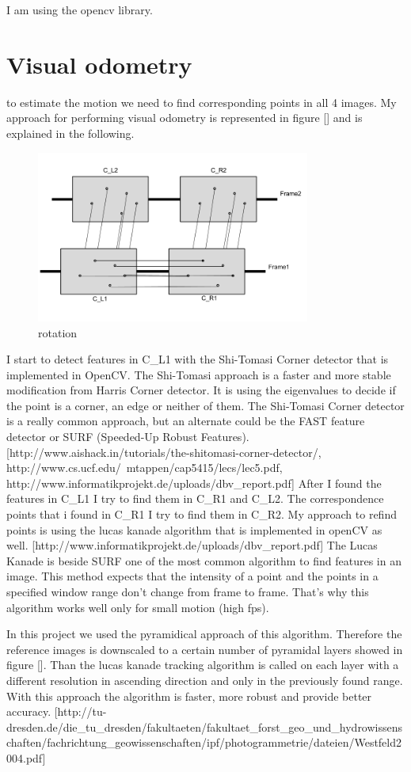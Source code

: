 \documentclass[11pt]{article}
\begin{document}
	I am using the opencv library.
	
	\section{Visual odometry}
	to estimate the motion we need to find corresponding points in all 4 images. My approach for performing visual odometry is represented in figure [] and is explained in the following.
	
	\begin{figure}[ht!]
		\centering
		\includegraphics[width=90mm]{images/setup.png}
		\caption{rotation \label{overflow}}
	\end{figure}
	
	I start to detect features in C\_L1 with the Shi-Tomasi Corner detector that is implemented in OpenCV. The Shi-Tomasi approach is a faster and more stable modification from Harris Corner detector. It is using the eigenvalues to decide if the point is a corner, an edge or neither of them. The Shi-Tomasi Corner detector is a really common approach, but an alternate could be the FAST feature detector or SURF (Speeded-Up Robust Features).
	[http://www.aishack.in/tutorials/the-shitomasi-corner-detector/, http://www.cs.ucf.edu/~mtappen/cap5415/lecs/lec5.pdf, http://www.informatikprojekt.de/uploads/dbv\_report.pdf]
	After I found the features in C\_L1 I try to find them in C\_R1 and C\_L2. The correspondence points that i found in C\_R1 I try to find them in C\_R2. 
	My approach to refind points is using the lucas kanade algorithm that is implemented in openCV as well. 
	[http://www.informatikprojekt.de/uploads/dbv\_report.pdf]
	The Lucas Kanade is beside SURF one of the most common algorithm to find features in an image. This method expects that the intensity of a point and the points in a specified window range don’t change from frame to frame. That's why this algorithm works well only for small motion (high fps). 
	
	In this project we used the pyramidical approach of this algorithm. Therefore the reference images is downscaled to a certain number of pyramidal layers showed in figure []. Than the lucas kanade tracking algorithm is called on each layer with a different resolution in ascending direction and only in the previously found range. With this approach the algorithm is faster, more robust and provide better accuracy. [http://tu-dresden.de/die\_tu\_dresden/fakultaeten/fakultaet\_forst\_geo\_und\_hydrowissenschaften/fachrichtung\_geowissenschaften/ipf/photogrammetrie/dateien/Westfeld2004.pdf]
	
\end{document}
